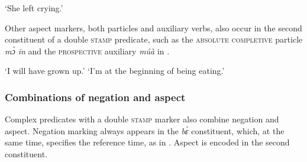    \trans `She left crying.'
\z

Other aspect markers, both particles and auxiliary verbs, also occur in the second constituent of a double \textsc{stamp} predicate, such as the \textsc{absolute completive} particle {\itshape mɔ̀ in } and  the \textsc{prospective} auxiliary {\itshape múà} in .

\ea\label{suba}
\jambox*{({\FUT} - {\COMPL})}
    \trans `I will have grown up.'
    \trans `I'm at the beginning of being eating.'
\z
\z



\subsubsection*{Combinations of negation and aspect}
Complex predicates with a double \textsc{stamp} marker also combine negation and aspect. Negation marking always appears in the {\itshape bɛ̀} constituent, which, at the same time,  specifies the reference time, as in . Aspect is encoded in the second constituent.


